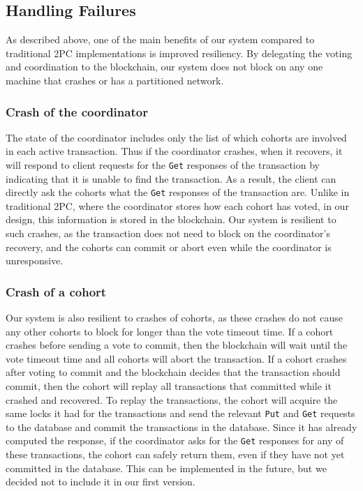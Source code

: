 \documentclass[11pt,sigplan,screen,nonacm]{acmart}
\begin{document}
\subsection{Handling Failures} \label{failurecases}
As described above, one of the main benefits of our system compared to traditional 2PC implementations is improved resiliency. By delegating the voting and coordination to the blockchain, our system does not block on any one machine that crashes or has a partitioned network.

\subsubsection{Crash of the coordinator}
The state of the coordinator includes only the list of which cohorts are involved in each active transaction. Thus if the coordinator crashes, when it recovers, it will respond to client requests for the \texttt{Get} responses of the transaction by indicating that it is unable to find the transaction. As a result, the client can directly ask the cohorts what the \texttt{Get} responses of the transaction are. Unlike in traditional 2PC, where the coordinator stores how each cohort has voted, in our design, this information is stored in the blockchain. Our system is resilient to such crashes, as the transaction does not need to block on the coordinator’s recovery, and the cohorts can commit or abort even while the coordinator is unresponsive.

\subsubsection{Crash of a cohort}
Our system is also resilient to crashes of cohorts, as these crashes do not cause any other cohorts to block for longer than the vote timeout time.  If a cohort crashes before sending a vote to commit, then the blockchain will wait until the vote timeout time and all cohorts will abort the transaction. If a cohort crashes after voting to commit and the blockchain decides that the transaction should commit, then the cohort will replay all transactions that committed while it crashed and recovered. To replay the transactions, the cohort will acquire the same locks it had for the transactions and send the relevant \texttt{Put} and \texttt{Get} requests to the database and commit the transactions in the database. Since it has already computed the response, if the coordinator asks for the \texttt{Get} responses for any of these transactions, the cohort can safely return them, even if they have not yet committed in the database. This can be implemented in the future, but we decided not to include it in our first version. 
\end{document}
